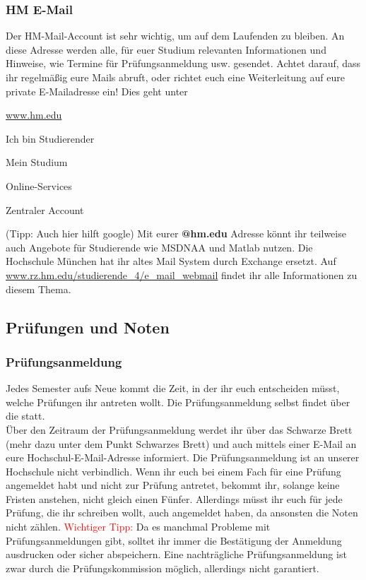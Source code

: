\subsubsection{HM E-Mail}

Der HM-Mail-Account ist sehr wichtig, um auf dem Laufenden zu bleiben. An diese Adresse werden alle, für euer Studium relevanten Informationen und Hinweise, wie Termine für Prüfungsanmeldung usw. gesendet. Achtet darauf, dass ihr regelmäßig eure Mails abruft, oder richtet euch eine Weiterleitung auf eure private E-Mailadresse ein!\doublebreak
Dies geht unter
\begin{sitenav}
	\item \url{www.hm.edu}
	\item Ich bin Studierender
	\item Mein Studium
	\item Online-Services
	\item Zentraler Account
\end{sitenav} (Tipp: Auch hier hilft google)\doublebreak
Mit eurer  \textbf{@hm.edu}  Adresse könnt ihr teilweise auch Angebote für Studierende wie MSDNAA und Matlab nutzen.\doublebreak
Die Hochschule München hat ihr altes Mail System durch Exchange ersetzt. Auf \url{www.rz.hm.edu/studierende_4/e_mail_webmail} findet ihr alle Informationen zu diesem Thema.

\subsection{Prüfungen und Noten}
\subsubsection{Prüfungsanmeldung}

Jedes Semester aufs Neue kommt die Zeit, in der ihr euch entscheiden müsst, welche Prüfungen ihr antreten wollt.\doublebreak
Die Prüfungsanmeldung selbst findet über die  statt.\\
Über den Zeitraum der Prüfungsanmeldung werdet ihr über das Schwarze Brett (mehr dazu unter dem Punkt \glqq Schwarzes Brett\grqq{}) und auch mittels einer E-Mail an eure Hochschul-E-Mail-Adresse informiert.\doublebreak
Die Prüfungsanmeldung ist an unserer Hochschule nicht verbindlich. Wenn ihr euch bei einem Fach für eine Prüfung angemeldet habt und nicht zur Prüfung antretet, bekommt ihr, solange keine Fristen anstehen, nicht gleich einen Fünfer. Allerdings müsst ihr euch für jede Prüfung, die ihr schreiben wollt, auch angemeldet haben, da ansonsten die Noten nicht zählen.\doublebreak 
\textcolor{red}{Wichtiger Tipp:} Da es manchmal Probleme mit Prüfungsanmeldungen gibt, solltet ihr immer die Bestätigung der Anmeldung ausdrucken oder sicher abspeichern. Eine nachträgliche Prüfungsanmeldung ist zwar durch die Prüfungskommission möglich, allerdings nicht garantiert.

